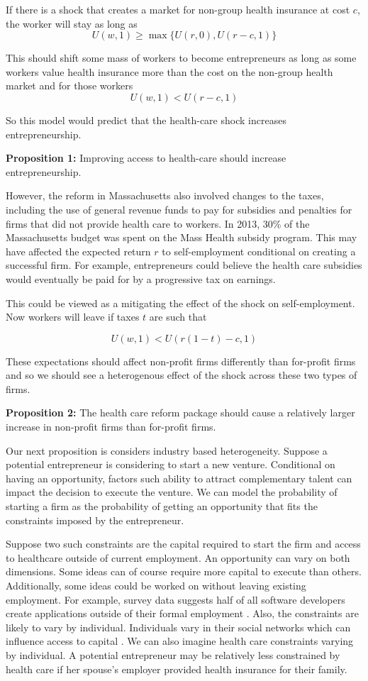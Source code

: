 \documentclass[12pt]{article}
\begin{document}
If there is a shock that creates a market for non-group health insurance at cost $c$, the worker will stay as long as
$$U(w,1) \ge \max\{U(r,0),U(r-c,1)\}$$

This should shift some mass of workers to become entrepreneurs as long as some workers value health insurance more than the cost on the non-group health market and for those workers
$$U(w,1) < U(r-c,1)$$

So this model would predict that the health-care shock increases entrepreneurship. 

\textbf{Proposition 1:} 
Improving access to health-care should increase entrepreneurship. 

However, the reform in Massachusetts also involved changes to the taxes, including the use of general revenue funds to pay for subsidies and penalties for firms that did not provide health care to workers. In 2013, 30\% of the Massachusetts budget was spent on the Mass Health \cite{masshealth} subsidy program. This may have affected the expected  return $r$ to self-employment conditional on creating a successful firm. For example, entrepreneurs could believe the health care subsidies would eventually be paid for by a progressive tax on earnings.

This could be viewed as a mitigating the effect of the shock on self-employment. Now workers will leave if taxes $t$ are such that

$$U(w,1) < U(r(1-t)-c,1)$$

These expectations should affect non-profit firms differently than for-profit firms and so we should see a heterogenous effect of the shock across these two types of firms. 

\textbf{Proposition 2:} 
The health care reform package should cause a relatively larger increase in non-profit firms than for-profit firms. 

Our next proposition is considers industry based heterogeneity. Suppose a potential entrepreneur is considering to start a new venture. Conditional on having an opportunity, factors such ability to attract complementary talent \cite{stuartSorensen} can impact the decision to execute the venture. We can model the probability of starting a firm as the probability of getting an opportunity that fits the constraints imposed by the entrepreneur. 

Suppose two such constraints are the capital required to start the firm and access to healthcare  outside of current employment. An opportunity can vary on both dimensions. Some ideas can of course require more capital to execute than others. Additionally, some ideas could be worked on without leaving existing employment. For example, survey data suggests half of all software developers create applications outside of their formal employment \cite{evans}. Also, the constraints are likely to vary by individual. Individuals vary in their social networks which can influence access to capital \cite{uzzi}. We can also imagine health care constraints varying by individual. A potential entrepreneur may be relatively less constrained by health care if her spouse's employer provided health insurance for their family. 
\end{document}
